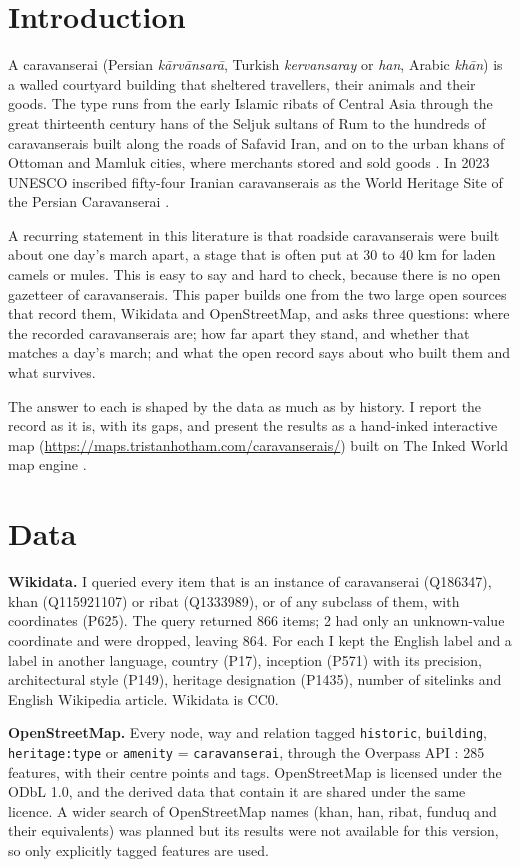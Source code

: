 \documentclass[11pt,a4paper]{article}
\begin{document}
\section{Introduction}
A caravanserai (Persian \emph{k\=arv\=ansar\=a}, Turkish \emph{kervansaray} or \emph{han}, Arabic \emph{kh\=an}) is a walled courtyard building that sheltered travellers, their animals and their goods. The type runs from the early Islamic ribats of Central Asia through the great thirteenth century hans of the Seljuk sultans of Rum to the hundreds of caravanserais built along the roads of Safavid Iran, and on to the urban khans of Ottoman and Mamluk cities, where merchants stored and sold goods \citep{erdmann1961,siroux1949,kiani1990,hillenbrand1994,constable2003}. In 2023 UNESCO inscribed fifty-four Iranian caravanserais as the World Heritage Site of the Persian Caravanserai \citep{unesco2023}.

A recurring statement in this literature is that roadside caravanserais were built about one day's march apart, a stage that is often put at 30 to 40 km for laden camels or mules. This is easy to say and hard to check, because there is no open gazetteer of caravanserais. This paper builds one from the two large open sources that record them, Wikidata and OpenStreetMap, and asks three questions: where the recorded caravanserais are; how far apart they stand, and whether that matches a day's march; and what the open record says about who built them and what survives.

The answer to each is shaped by the data as much as by history. I report the record as it is, with its gaps, and present the results as a hand-inked interactive map (\url{https://maps.tristanhotham.com/caravanserais/}) built on The Inked World map engine \citep{inkmap}.

\section{Data}
\textbf{Wikidata.} I queried every item that is an instance of caravanserai (Q186347), khan (Q115921107) or ribat (Q1333989), or of any subclass of them, with coordinates (P625). The query returned 866 items; 2 had only an unknown-value coordinate and were dropped, leaving 864. For each I kept the English label and a label in another language, country (P17), inception (P571) with its precision, architectural style (P149), heritage designation (P1435), number of sitelinks and English Wikipedia article. Wikidata is CC0.

\textbf{OpenStreetMap.} Every node, way and relation tagged \texttt{historic}, \texttt{building}, \texttt{heritage:type} or \texttt{amenity} = \texttt{caravanserai}, through the Overpass API \citep{osm}: 285 features, with their centre points and tags. OpenStreetMap is licensed under the ODbL 1.0, and the derived data that contain it are shared under the same licence. A wider search of OpenStreetMap names (khan, han, ribat, funduq and their equivalents) was planned but its results were not available for this version, so only explicitly tagged features are used.
\end{document}

